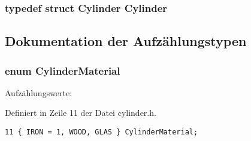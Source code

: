 \subsubsection{\setlength{\rightskip}{0pt plus 5cm}typedef struct {\bf Cylinder}  {\bf Cylinder}}\label{build_2inc_2cylinder_8h_2ec2c2961c7ce5a114d969c1f562a563}




\subsection{Dokumentation der Aufz\"{a}hlungstypen}
\subsubsection{\setlength{\rightskip}{0pt plus 5cm}enum {\bf Cylinder\-Material}}\label{build_2inc_2cylinder_8h_4e5ff3b99924220a69e25e53edcaeb31}


\begin{Desc}
\item[Aufz\"{a}hlungswerte: ]\par
\begin{description}
\item[{\em 
IRON\label{build_2inc_2cylinder_8h_4e5ff3b99924220a69e25e53edcaeb3172cfeced8656bc799e87bdc6b1aa7ddf}
}]\item[{\em 
WOOD\label{build_2inc_2cylinder_8h_4e5ff3b99924220a69e25e53edcaeb318029fbd172f8364c78bd96ba415014d5}
}]\item[{\em 
GLAS\label{build_2inc_2cylinder_8h_4e5ff3b99924220a69e25e53edcaeb312ad3b4e3bd1cb102d5b5d2a436979755}
}]\end{description}
\end{Desc}



Definiert in Zeile 11 der Datei cylinder.h.

\footnotesize\begin{verbatim}11 { IRON = 1, WOOD, GLAS } CylinderMaterial;
\end{verbatim}\normalsize 




